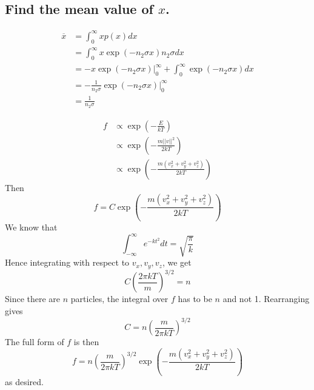 \documentclass[answers]{exam}
\begin{document}
\begin{questions}
\begin{parts}
\part{Find the mean value of $x$.}

\begin{solution}
    \begin{align*}
        \overline x &= \int_0^\infty xp(x)dx \\
                    &= \int_0^\infty x\exp(-n_2\sigma x)n_2\sigma dx \\
                    &= -x\exp(-n_2\sigma x) \Big |_0^\infty + \int_0^\infty \exp(-n_2\sigma x) dx \\
                    &= -\frac{1}{n_2\sigma}\exp(-n_2\sigma x) \Big |_0^\infty \\
                    &= \frac{1}{n_2\sigma}
    \end{align*}
\end{solution}

\end{parts}


\begin{solution}
    \begin{align*}
        f &\propto \exp\left(-\frac{E}{kT}\right) \\
          &\propto \exp\left(-\frac{m||v||^2}{2kT}\right) \\
          &\propto \exp\left(-\frac{m(v_x^2+v_y^2+v_z^2)}{2kT}\right)
    \end{align*}
    Then
    $$f = C\exp\left(-\frac{m(v_x^2+v_y^2+v_z^2)}{2kT}\right)$$
    We know that
    $$\int_{-\infty}^\infty e^{-kt^2}dt = \sqrt{\frac{\pi}{k}}$$
    Hence integrating with respect to $v_x, v_y, v_z$, we get
    $$C\left(\frac{2\pi kT}{m}\right)^{3/2} = n$$
    Since there are $n$ particles, the integral over $f$ has to be $n$ and not 1. Rearranging gives
    $$C = n\left(\frac{m}{2\pi kT}\right)^{3/2}$$
    The full form of $f$ is then
    $$f = n\left(\frac{m}{2\pi kT}\right)^{3/2} \exp\left(-\frac{m(v_x^2+v_y^2+v_z^2)}{2kT}\right)$$
    as desired.
\end{solution}



\end{questions}
\end{document}
